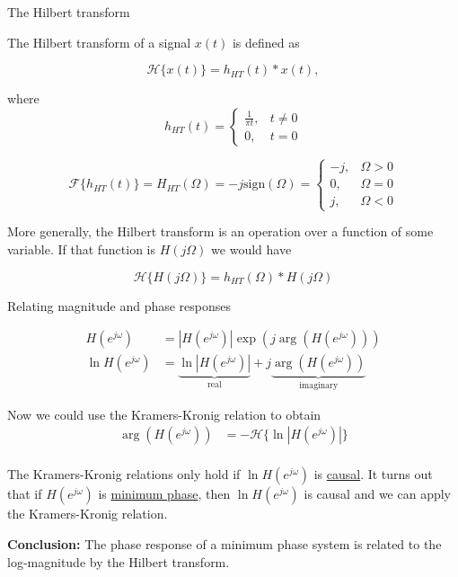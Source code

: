 \documentclass[10pt]{beamer}
\begin{document}
\begin{frame}{The Hilbert transform}

The Hilbert transform of a signal $x(t)$ is defined as

\begin{equation*}
\mathcal{H}\{x(t)\} = h_{HT}(t)\ast x(t),
\end{equation*}

where 
\begin{equation*}
h_{HT}(t) = \begin{cases}
\frac{1}{\pi t}, & t \neq 0 \\
0, & t = 0
\end{cases}
\end{equation*}

\begin{equation*}
\mathcal{F}\{h_{HT}(t)\}  = H_{HT}(\Omega) = -j\mathrm{sign}(\Omega) = \begin{cases}
-j, & \Omega > 0 \\
0, & \Omega = 0 \\
j, & \Omega < 0
\end{cases}
\end{equation*}

More generally, the Hilbert transform is an operation over a function of some variable. If that function is $H(j\Omega)$ we would have

\begin{equation*}
\mathcal{H}\{H(j\Omega)\} = h_{HT}(\Omega)\ast H(j\Omega)
\end{equation*}

\end{frame}

\begin{frame}{Relating magnitude and phase responses}

\begin{align*}
H(e^{j\omega}) &= |H(e^{j\omega})|\exp(j\arg(H(e^{j\omega}))) \\
\ln H(e^{j\omega}) &= \underbrace{\ln |H(e^{j\omega})|}_{\text{real}} + j\underbrace{\arg(H(e^{j\omega}))}_{\text{imaginary}} \tag{taking $\ln$ of both sides}
\end{align*}

Now we could use the Kramers-Kronig relation to obtain
\begin{align*}
\arg(H(e^{j\omega})) &= -\mathcal{H}\{\ln |H(e^{j\omega})|\} \\
\end{align*}

The Kramers-Kronig relations only hold if $\ln H(e^{j\omega})$ is \underline{causal}. It turns out that if $H(e^{j\omega})$ is \underline{minimum phase}, then  $\ln H(e^{j\omega})$ is causal and we can apply the Kramers-Kronig relation.

\textbf{Conclusion:} The phase response of a minimum phase system is related to the  log-magnitude by the Hilbert transform.


\end{frame}
\end{document}

